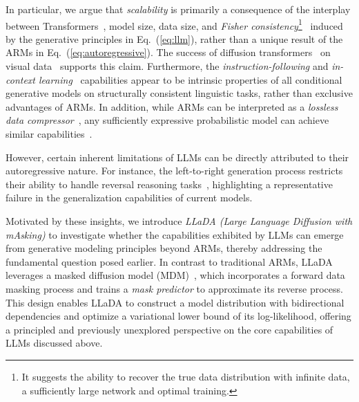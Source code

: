 \documentclass{article}
\begin{document}
In particular, we argue that \emph{scalability} is primarily a consequence of the interplay between Transformers~\citep{vaswani2017attention}, model size, data size, and \emph{Fisher consistency}\footnote{It suggests the ability to recover the true data distribution with infinite data, a sufficiently large network and optimal training.}~\citep{fisher1922mathematical} induced by the generative principles in Eq.~(\ref{eq:llm}), rather than a unique result of the ARMs in Eq.~(\ref{eq:autoregressive}). The success of diffusion transformers~\citep{bao2023all,peebles2023scalable} on visual data~\citep{videoworldsimulators2024} supports this claim. Furthermore, the \emph{instruction-following} and \emph{in-context learning}~\citep{brown2020language} capabilities appear to be intrinsic properties of all conditional generative models on structurally consistent linguistic tasks, rather than exclusive advantages of ARMs. In addition, while ARMs can be interpreted as a \emph{lossless data compressor}~\citep{deletanglanguage,huang2024compression}, any sufficiently expressive probabilistic model can achieve similar capabilities~\citep{shannon1948mathematical}.

However, certain inherent limitations of LLMs can be directly attributed to their autoregressive nature. For instance, the left-to-right generation process restricts their ability to handle reversal reasoning tasks~\citep{berglund2023reversal}, highlighting a representative failure in the generalization capabilities of current models.
 
Motivated by these insights, we introduce \emph{LLaDA (Large Language Diffusion with mAsking)} to investigate whether the capabilities exhibited by LLMs can emerge from generative modeling principles beyond ARMs, thereby addressing the fundamental question posed earlier. In contrast to traditional ARMs, LLaDA leverages a masked diffusion model (MDM)~\citep{austin2021structured,lou2023discrete,shi2024simplified,sahoo2024simple,ou2024your}, which incorporates a forward data masking process and trains a \emph{mask predictor} to approximate its reverse process. This design enables LLaDA to construct a model distribution with bidirectional dependencies and optimize a variational lower bound of its log-likelihood, offering a principled and previously unexplored perspective on the core capabilities of LLMs discussed above.
\end{document}
